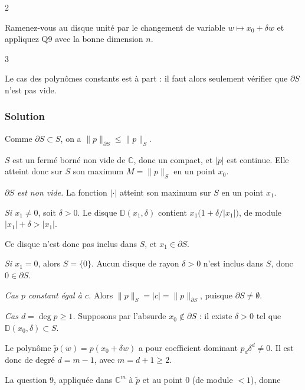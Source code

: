 \documentclass[11pt,a4paper]{article}
\begin{document}
\begin{indication}{2}

Ramenez-vous au disque unité par le changement de variable \(w\mapsto x_0+\delta w\) et appliquez Q9 avec la bonne dimension \(n\).

\end{indication}

\begin{indication}{3}

Le cas des polynômes constants est à part : il faut alors seulement vérifier que \(\partial S\) n'est pas vide.

\end{indication}

\hypertarget{solution-9}{%
\subsubsection{Solution}\label{solution-9}}

Comme \(\partial S\subset S\), on a \(\|p\|_{\partial S}\le\|p\|_S\).

\(S\) est un fermé borné non vide de \(\mathbb C\), donc un compact, et \(|p|\) est continue. Elle atteint donc sur \(S\) son maximum \(M=\|p\|_S\) en un point \(x_0\).

\emph{\(\partial S\) est non vide.} La fonction \(|\cdot|\) atteint son maximum sur \(S\) en un point \(x_1\).

\emph{Si \(x_1\neq0\)}, soit \(\delta>0\). Le disque \(\mathbb D(x_1,\delta)\) contient \(x_1\big(1+\delta/|x_1|\big)\), de module \(|x_1|+\delta>|x_1|\).

Ce disque n'est donc pas inclus dans \(S\), et \(x_1\in\partial S\).

\emph{Si \(x_1=0\)}, alors \(S=\{0\}\). Aucun disque de rayon \(\delta>0\) n'est inclus dans \(S\), donc \(0\in\partial S\).

\emph{Cas \(p\) constant égal à \(c\).} Alors \(\|p\|_S=|c|=\|p\|_{\partial S}\), puisque \(\partial S\neq\emptyset\).

\emph{Cas \(d=\deg p\ge1\).} Supposons par l'absurde \(x_0\notin\partial S\) : il existe \(\delta>0\) tel que \(\mathbb D(x_0,\delta)\subset S\).

Le polynôme \(\tilde p(w)=p(x_0+\delta w)\) a pour coefficient dominant \(p_d\delta^d\neq0\). Il est donc de degré \(d=m-1\), avec \(m=d+1\ge2\).

La question 9, appliquée dans \(\mathbb C^m\) à \(\tilde p\) et au point \(0\) (de module \(<1\)), donne
\end{document}
